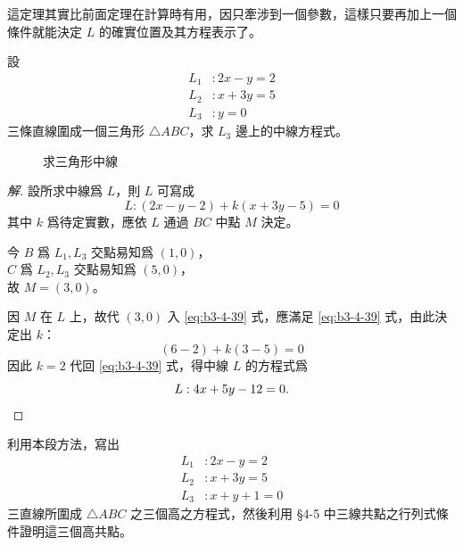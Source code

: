 這定理其實比前面定理在計算時有用，因只牽涉到一個參數，這樣只要再加上一個條件就能決定 $L$ 的確實位置及其方程表示了。

\begin{example}
設
\begin{align*}
L_1 &: 2x - y = 2 \\
L_2 &: x + 3y = 5 \\
L_3 &: y = 0
\end{align*}
三條直線圍成一個三角形 $\triangle ABC$，求 $L_3$ 邊上的中線方程式。
\end{example}

\begin{figure}[H]
\centering
{}
\caption{求三角形中線}
\label{fig:4-45}
\end{figure}

\begin{proof}[解]
設所求中線爲 $L$，則 $L$ 可寫成
\begin{equation}
L : (2x - y - 2) + k(x + 3y - 5) = 0
\label{eq:b3-4-39}
\end{equation}
其中 $k$ 爲待定實數，應依 $L$ 通過 $BC$ 中點 $M$ 決定。

今 $B$ 爲 $L_1, L_3$ 交點易知爲 $(1, 0)$，\\
$C$ 爲 $L_2, L_3$ 交點易知爲 $(5, 0)$，\\
故 $M = (3, 0)$。

因 $M$ 在 $L$ 上，故代 $(3, 0)$ 入 \eqref{eq:b3-4-39} 式，應滿足 \eqref{eq:b3-4-39} 式，由此決定出 $k$：
\[
(6 - 2) + k(3 - 5) = 0
\]
因此 $k = 2$ 代回 \eqref{eq:b3-4-39} 式，得中線 $L$ 的方程式爲
\[
L : 4x + 5y - 12 = 0. \qedhere
\]
\end{proof}

\begin{exercise}[作業 23]
利用本段方法，寫出
\begin{align*}
L_1 &: 2x - y = 2 \\
L_2 &: x + 3y = 5 \\
L_3 &: x + y + 1 = 0
\end{align*}
三直線所圍成 $\triangle ABC$ 之三個高之方程式，然後利用 \S 4-5 中三線共點之行列式條件證明這三個高共點。
\end{exercise}

